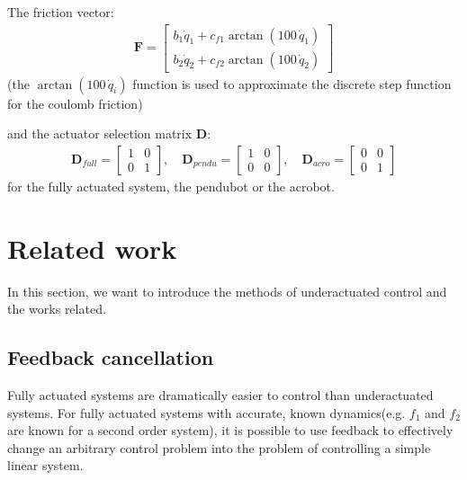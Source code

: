     The friction vector:
    \begin{equation}
        \begin{split}
            \mathbf{F} =
            \left[
                \begin{matrix}
                    b_1 \dot{q}_1 + c_{f1} \arctan(100\,\dot{q}_1) \\
                    b_2 \dot{q}_2 + c_{f2} \arctan(100\,\dot{q}_2)
                \end{matrix}
            \right]
        \end{split}
    \end{equation}
    (the \(\arctan(100\,\dot{q}_i)\) function is used to approximate the discrete step function for the coulomb friction)

    and the actuator selection matrix \(\mathbf{D}\):
    \begin{equation}
        \begin{split}
            \mathbf{D}_{full} =
            \left[
                \begin{matrix}
                    1 & 0 \\
                    0 & 1
                \end{matrix}
            \right],
            \quad
            \mathbf{D}_{pendu} =
            \left[
                \begin{matrix}
                    1 & 0 \\
                    0 & 0
                \end{matrix}
            \right],
            \quad
            \mathbf{D}_{acro} =
            \left[
                \begin{matrix}
                    0 & 0 \\
                    0 & 1
                \end{matrix}
            \right]
        \end{split}
    \end{equation}
    for the fully actuated system, the pendubot or the acrobot.

\section{Related work}
In this section, we want to introduce the methods of underactuated control and the works related.

\subsection{Feedback cancellation}
Fully actuated systems are dramatically easier to control than underactuated systems. For fully actuated systems with accurate, known dynamics(e.g. \(f_1\) and \(f_2\) are known for a second order system), it is possible to use feedback to effectively change an arbitrary control problem into the problem of controlling a simple linear system.

